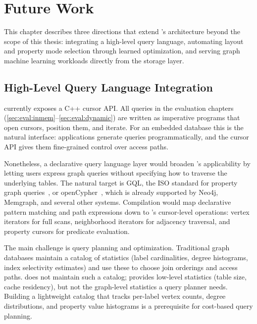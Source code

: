 \chapter{Future Work}
\label{sec:future-work}

This chapter describes three directions that extend \project{}'s architecture beyond the scope of this thesis: integrating a high-level query language, automating layout and property mode selection through learned optimization, and serving graph machine learning workloads directly from the storage layer.

\section{High-Level Query Language Integration}
\label{sec:future:query-lang}

\project{} currently exposes a C++ cursor API.
All queries in the evaluation chapters (\autoref{sec:eval:inmem}--\autoref{sec:eval:dynamic}) are written as imperative programs that open cursors, position them, and iterate.
For an embedded database this is the natural interface: applications generate queries programmatically, and the cursor API gives them fine-grained control over access paths.

Nonetheless, a declarative query language layer would broaden \project{}'s applicability by letting users express graph queries without specifying how to traverse the underlying tables.
The natural target is GQL, the ISO standard for property graph queries~\cite{francis2023gql-standard}, or openCypher~\cite{openCypher}, which is already supported by Neo4j, Memgraph, and several other systems.
Compilation would map declarative pattern matching and path expressions down to \project{}'s cursor-level operations: vertex iterators for full scans, neighborhood iterators for adjacency traversal, and property cursors for predicate evaluation.

The main challenge is query planning and optimization.
Traditional graph databases maintain a catalog of statistics (label cardinalities, degree histograms, index selectivity estimates) and use these to choose join orderings and access paths.
\project{} does not maintain such a catalog; \wt{} provides low-level statistics (table size, cache residency), but not the graph-level statistics a query planner needs.
Building a lightweight catalog that tracks per-label vertex counts, degree distributions, and property value histograms is a prerequisite for cost-based query planning.

